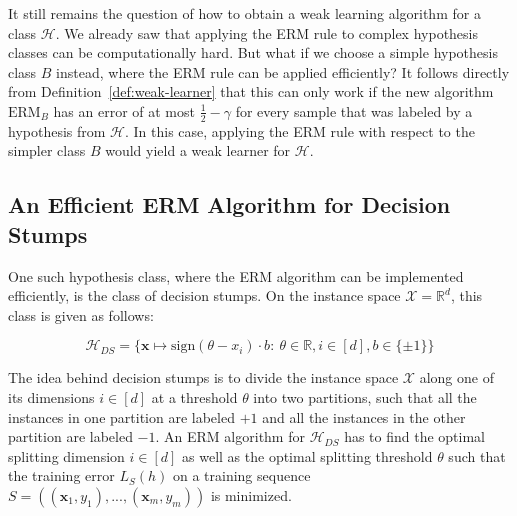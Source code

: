 It still remains the question of how to obtain a weak learning algorithm for a class $\mathcal{H}$.
We already saw that applying the ERM rule to complex hypothesis classes can be computationally hard.
But what if we choose a simple hypothesis class $B$ instead, where the ERM rule can be applied efficiently?
It follows directly from Definition~\ref{def:weak-learner} that this can only work if the new algorithm
$\text{ERM}_B$ has an error of at most $\frac{1}{2} - \gamma$ for every sample that was labeled by a hypothesis from
$\mathcal{H}$. In this case, applying the ERM rule with respect to the simpler class $B$ would yield a weak learner
for $\mathcal{H}$.

\subsection{An Efficient ERM Algorithm for Decision Stumps}

One such hypothesis class, where the ERM algorithm can be implemented efficiently, is the class of decision stumps.
On the instance space $\mathcal{X} = \mathbb{R}^d$,  this class is given as follows:
\begin{linenomath}
\begin{equation*}
    \mathcal{H}_{DS} = \{ \mathbf{x} \mapsto \text{sign}\left( \theta - x_i \right) \cdot b: \ 
        \theta \in \mathbb{R}, i \in \left[ d \right], b \in \{ \pm 1 \} \}
\end{equation*}
\end{linenomath}

The idea behind decision stumps is to divide the instance space $\mathcal{X}$ along one of its dimensions
$i \in \left[ d \right]$ at a threshold $\theta$ into two partitions, 
such that all the instances in one partition are labeled
$+1$ and all the instances in the other partition are labeled $-1$.
An ERM algorithm for $\mathcal{H}_{DS}$ has to find the optimal splitting dimension $i \in \left[ d \right]$ as well
as the optimal splitting threshold $\theta$ such that the training error $L_S(h)$ on a training sequence
$S = \left( (\mathbf{x}_1, y_1),...,(\mathbf{x}_m, y_m) \right)$ is minimized.

